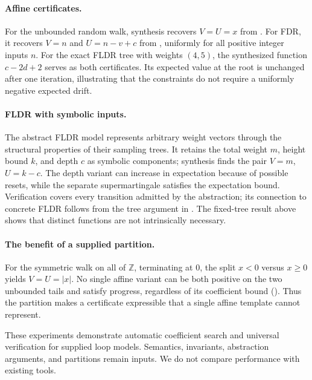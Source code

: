 \paragraph{Affine certificates.}
For the unbounded random walk, synthesis recovers $V=U=x$ from
. For FDR, it recovers $V=n$ and $U=n-v+c$
from , uniformly for all positive integer inputs $n$.
For the exact FLDR tree with weights $(4,5)$, the synthesized function
$c-2d+2$ serves as both certificates. Its expected value at the root
is unchanged after one iteration, illustrating that the constraints
do not require a uniformly negative expected drift.

\paragraph{FLDR with symbolic inputs.}
The abstract FLDR model represents arbitrary weight vectors through the
structural properties of their sampling trees. It retains the total
weight $m$, height bound $k$, and depth $c$ as symbolic components;
synthesis finds the pair $V=m$, $U=k-c$. The depth variant can increase in
expectation because of possible resets, while the separate supermartingale satisfies
the expectation bound. Verification covers every transition admitted
by the abstraction; its connection to concrete FLDR follows from the
tree argument in . The fixed-tree result above
shows that distinct functions are not intrinsically necessary.

\paragraph{The benefit of a supplied partition.}
For the symmetric walk on all of $\mathbb Z$, terminating at $0$, the
split $x<0$ versus $x\geq0$ yields $V=U=|x|$. No single affine variant
can be both positive on the two unbounded tails and satisfy progress,
regardless of its coefficient bound
(). Thus the partition makes a certificate
expressible that a single affine template cannot represent.

These experiments demonstrate automatic coefficient search and universal
verification for supplied loop models. Semantics, invariants, abstraction
arguments, and partitions remain inputs. We do not compare performance
with existing tools.
